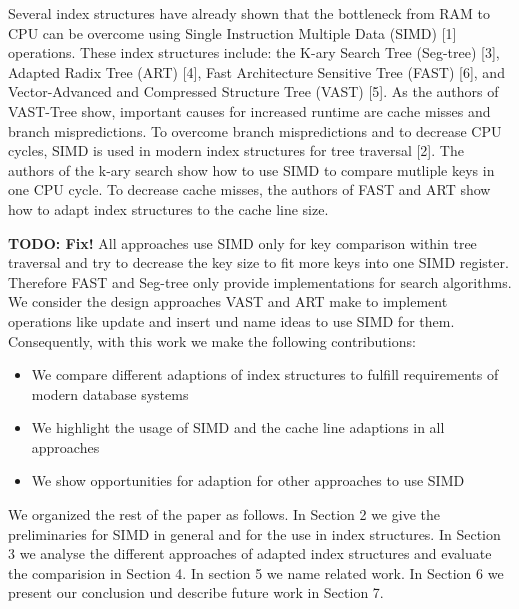 \documentclass[conference]{IEEEtran}
\begin{document}
Several index structures have already shown that the bottleneck from RAM to CPU can be overcome using Single Instruction Multiple Data (SIMD) [1] operations. These index structures include: the K-ary Search Tree (Seg-tree) [3], Adapted Radix Tree (ART) [4], Fast Architecture Sensitive Tree (FAST) [6], and Vector-Advanced and Compressed Structure Tree (VAST) [5]. As the authors of VAST-Tree show, important causes for increased runtime are cache misses and branch mispredictions. To overcome branch mispredictions and to decrease CPU cycles, SIMD  is used in modern index structures for tree traversal [2]. The authors of the k-ary search show how to use SIMD to compare mutliple keys in one CPU cycle. To decrease cache misses, the authors of FAST and ART show how to adapt index structures to the cache line size.  

\textbf{TODO: Fix!} All approaches use SIMD only for key comparison within tree traversal and try to decrease the key size to fit more keys into one SIMD register. Therefore FAST and Seg-tree only provide implementations for search algorithms. We consider the design approaches VAST and ART make to implement operations like update and insert und name ideas to use SIMD for them. Consequently, with this work we make the following contributions:
\begin{itemize}
	\item We compare different adaptions of index structures to fulfill requirements of modern database systems
	\item We highlight the usage of SIMD and the cache line adaptions in all approaches
	\item We show opportunities for adaption for other approaches to use SIMD
\end{itemize}
We organized the rest of the paper as follows. In Section 2 we give the preliminaries for SIMD in general and for the use in index structures. In Section 3 we analyse the different approaches of adapted index structures and evaluate the comparision in Section 4. In section 5 we name related work. In Section 6 we present our conclusion und describe future work in Section 7. 
\end{document}
